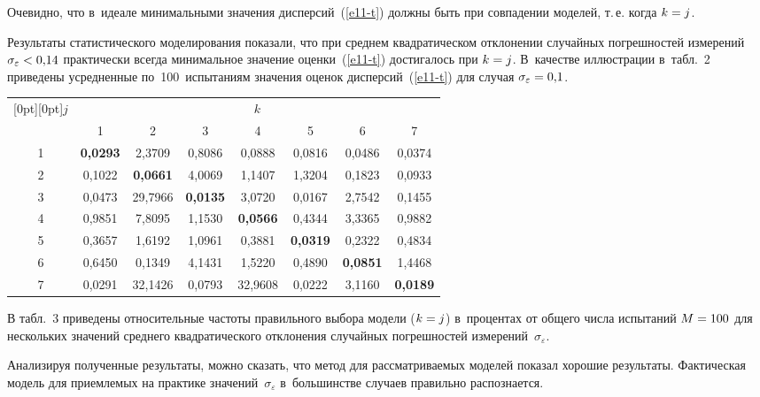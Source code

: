\begin{multicols}{2}
  Очевидно, что в~идеале минимальными значения дисперсий~(\ref{e11-t}) 
должны быть при совпадении моделей, т.\,е. когда $k\hm= j$.
  
  Результаты статистического моделирования показали, что при среднем 
квадратическом отклонении случайных погрешностей измерений 
$\sigma_\varepsilon\hm< 0{,}14$ практически всегда минимальное значение 
оценки~(\ref{e11-t}) достигалось при $k\hm=j$. В~качестве иллюстрации 
в~табл.~2 приведены усредненные по~100~испытаниям значения оценок 
дисперсий~(\ref{e11-t}) для случая $\sigma_\varepsilon\hm = 0{,}1$.

\begin{table*}\small
\begin{center}
\vspace*{2ex}

\tabcolsep=8pt
\begin{tabular}{|c|c|c|c|c|c|c|c|}
\hline
\multicolumn{1}{|c|}{\raisebox{-6pt}[0pt][0pt]{$j$}}&\multicolumn{7}{c|}{$k$}\\
\cline{2-8}
& 1&2&3&4&5&6&7\\
\hline
1&\textbf{0,0293}&2,3709&0,8086&0,0888&0,0816&0,0486&0,0374\\
2&0,1022&\textbf{0,0661}&4,0069&1,1407&1,3204&0,1823&0,0933\\
3&0,0473&29,7966\hphantom{9}&\textbf{0,0135}&3,0720&0,0167&2,7542&0,1455\\
4&0,9851&7,8095&1,1530&\textbf{0,0566}&0,4344&3,3365&0,9882\\
5&0,3657&1,6192&1,0961&0,3881&\textbf{0,0319}&0,2322&0,4834\\
6&0,6450&0,1349&4,1431&1,5220&0,4890&\textbf{0,0851}&1,4468\\
7&0,0291&32,1426\hphantom{9}&0,0793&32,9608\hphantom{9}&0,0222&3,1160&\textbf{0,0189}\\
\hline
\end{tabular}
\end{center}
\end{table*}
  
  
  В табл.~3 приведены относительные частоты правильного выбора модели 
($k\hm= j$) в~процентах от общего числа испытаний $M\hm = 100$ для 
нескольких значений среднего квадратического отклонения случайных 
погрешностей измерений~$\sigma_\varepsilon$.
  

  
  Анализируя полученные результаты, можно сказать, что метод для 
рассматриваемых моделей показал хорошие результаты. Фактическая модель 
для приемлемых на практике значений~$\sigma_\varepsilon$ в~большинстве 
случаев правильно распознается.


\end{multicols}
